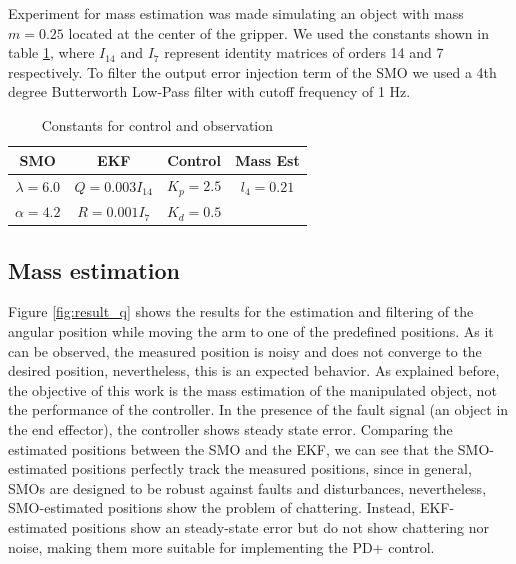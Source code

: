 \documentclass[smallextended]{svjour3}       %
\begin{document}
Experiment for mass estimation was made simulating an object with mass $m=0.25$ located at the center of the gripper. We used the constants shown in table \ref{tab:constants}, where $I_{14}$ and $I_7$ represent identity matrices of orders 14 and 7 respectively. To filter the output error injection term of the SMO we used a 4th degree Butterworth Low-Pass filter with cutoff frequency of 1 Hz. 
\begin{table}[h!]
  \centering
  \begin{tabular}{|c|c|c|c|}
    \hline
    SMO & EKF & Control & Mass Est\\
    \hline
    $\lambda=6.0$ & $Q = 0.003I_{14}$ & $K_p= 2.5$ & $l_4 = 0.21$\\
    $\alpha=4.2$ & $R = 0.001I_7$ & $K_d = 0.5$  & \\
    \hline
  \end{tabular}
  \caption{Constants for control and observation}
  \label{tab:constants}
\end{table}

\subsection{Mass estimation}
Figure \ref{fig:result_q} shows the results for the estimation and filtering of the angular position while moving the arm to one of the predefined positions. As it can be observed, the measured position is noisy and does not converge to the desired position, nevertheless, this is an expected behavior. As explained before, the objective of this work is the mass estimation of the manipulated object, not the performance of the controller. In the presence of the fault signal (an object in the end effector), the controller shows steady state error. Comparing the estimated positions between the SMO and the EKF, we can see that the SMO-estimated positions perfectly track the measured positions, since in general, SMOs are designed to be robust against faults and disturbances, nevertheless, SMO-estimated positions show the problem of chattering. Instead, EKF-estimated positions show an steady-state error but do not show chattering nor noise, making them more suitable for implementing the PD+ control. 
\end{document}
